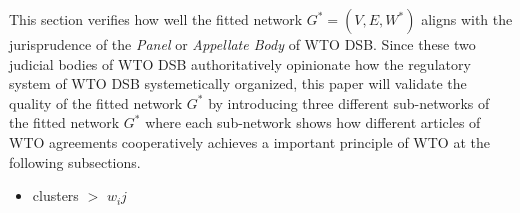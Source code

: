 This section verifies
how well the fitted network $G^* = (V, E, W^*)$
aligns with the jurisprudence of the \textit{Panel} or \textit{Appellate Body} of WTO DSB.
Since these two judicial bodies of WTO DSB authoritatively
opinionate how the regulatory system of WTO DSB systemetically organized,
this paper will validate the quality of the fitted network $G^*$ by 
introducing three different sub-networks of 
the fitted network $G^*$ where each sub-network shows how different articles of WTO agreements 
cooperatively achieves a important principle of WTO 
at the following subsections.


\begin{itemize}
    \item clusters $>$ $w_ij$
\end{itemize}